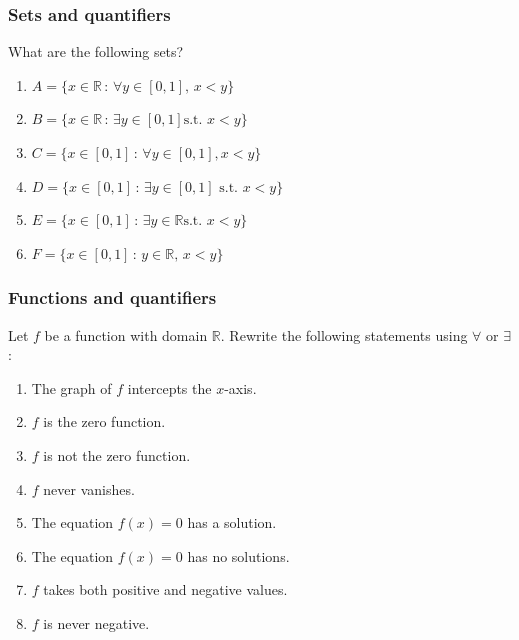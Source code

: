 \begin{frame}
	\frametitle{Sets and quantifiers}

	What are the following sets?

	\begin{enumerate}
		\item $\displaystyle A = \{ x \in \mathbb{R}\, : \, \forall y \in [0,1], \, x
			< y \}$

		\item $\displaystyle B = \{ x \in \mathbb{R}\, : \, \exists y \in [0,1] \text{
			s.t. }x < y \}$

		\item $\displaystyle C = \{ x \in [0,1] \, : \, \forall y \in [0,1], x < y \}$

		\item $\displaystyle D = \{ x \in [0,1] \, : \, \exists y \in [0,1] \text{ s.t.
			}x < y \}$

		\item $\displaystyle E = \{ x \in [0,1] \, : \, \exists y \in \mathbb{R}\text{
			s.t. }x < y \}$

		\item $\displaystyle F = \{ x \in [0,1] \, : \, y \in \mathbb{R}, \, x < y \}$
	\end{enumerate}
\end{frame}

\begin{frame}
	\frametitle{Functions and quantifiers}

	Let $f$ be a function with domain $\mathbb{R}$. Rewrite the following statements
	using $\forall$ or $\exists$:

	\begin{enumerate}
		\item The graph of $f$ intercepts the $x$-axis.

		\item $f$ is the zero function.

		\item $f$ is not the zero function.

		\item $f$ never vanishes.

		\item The equation $\displaystyle f(x)=0$ has a solution.

		\item The equation $\displaystyle f(x)=0$ has no solutions.

		\item $f$ takes both positive and negative values.

		\item $f$ is never negative.
	\end{enumerate}
\end{frame}

